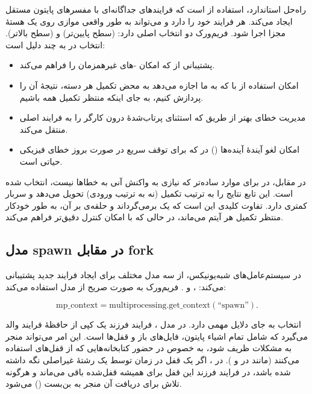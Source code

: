 راه‌حل استاندارد، استفاده از  است که فرایندهای جداگانه‌ای با مفسرهای پایتون مستقل ایجاد می‌کند. هر فرایند  خود را دارد و می‌تواند به طور واقعی موازی روی یک هستۀ  مجزا اجرا شود. فریم‌ورک دو انتخاب اصلی دارد:  (سطح پایین‌تر) و  (سطح بالاتر). انتخاب  در  به چند دلیل است:

\begin{itemize}
	\item پشتیبانی از  که امکان -های غیرهمزمان را فراهم می‌کند.
	\item امکان استفاده از  با  که به ما اجازه می‌دهد به محض تکمیل هر دسته، نتیجۀ آن را پردازش کنیم، به جای اینکه منتظر تکمیل همه باشیم.
	\item مدیریت خطای بهتر از طریق  که استثنای پرتاب‌شدۀ درون کارگر را به فرایند اصلی منتقل می‌کند.
	\item امکان لغو آیندۀ آینده‌ها () در  که برای توقف سریع در صورت بروز خطای فیزیکی حیاتی است.
\end{itemize}

در مقابل،  در  برای موارد ساده‌تر که نیازی به واکنش آنی به خطاها نیست، انتخاب شده است. این تابع نتایج را به ترتیب تکمیل (نه به ترتیب ورودی) تحویل می‌دهد و سربار کمتری دارد. تفاوت کلیدی این است که  یک  برمی‌گرداند و حلقه‌ی  بر آن، به طور خودکار منتظر تکمیل هر آیتم می‌ماند، در حالی که  با  امکان کنترل دقیق‌تر فراهم می‌کند.

\subsection{مدل spawn در مقابل fork}

در سیستم‌عامل‌های شبه‌یونیکس،  از سه مدل مختلف برای ایجاد فرایند جدید پشتیبانی می‌کند: ،  و . فریم‌ورک  به صورت صریح از مدل  استفاده می‌کند:

\begin{equation}
	\text{mp\_context} = \text{multiprocessing.get\_context}(\text{``spawn''}).
\end{equation}

\noindent انتخاب  به جای  دلایل مهمی دارد. در مدل ، فرایند فرزند یک کپی از حافظۀ فرایند والد می‌گیرد که شامل تمام اشیاء پایتون، فایل‌های باز و قفل‌ها است. این امر می‌تواند منجر به مشکلات ظریف شود، به خصوص در حضور کتابخانه‌هایی که از قفل‌های  استفاده می‌کنند (مانند  در  و ). در ، اگر یک قفل در زمان  توسط یک رشتۀ غیراصلی نگه داشته شده باشد، در فرایند فرزند این قفل برای همیشه قفل‌شده باقی می‌ماند و هرگونه تلاش برای دریافت آن منجر به بن‌بست () می‌شود.

